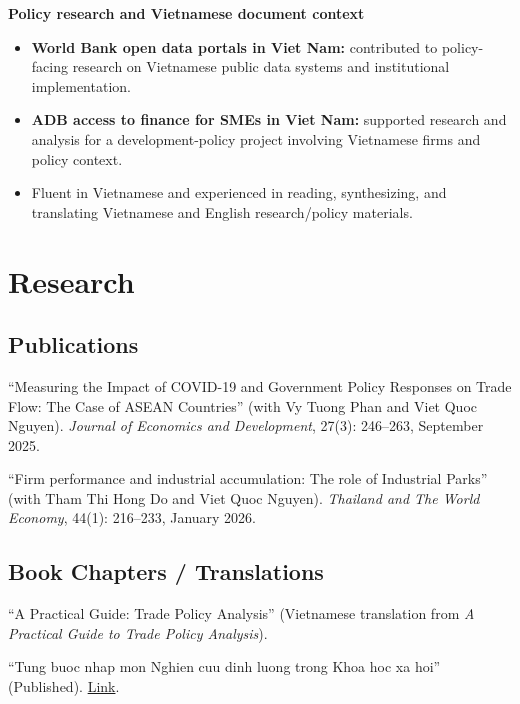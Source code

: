 \documentclass[10pt]{article}
\begin{document}
\textbf{Policy research and Vietnamese document context}
\begin{itemize}
\item \textbf{World Bank open data portals in Viet Nam:} contributed to policy-facing research on Vietnamese public data systems and institutional implementation.
\item \textbf{ADB access to finance for SMEs in Viet Nam:} supported research and analysis for a development-policy project involving Vietnamese firms and policy context.
\item Fluent in Vietnamese and experienced in reading, synthesizing, and translating Vietnamese and English research/policy materials.
\end{itemize}

\section{Research}
\subsection{Publications}
\begin{enumerate}[label={[\arabic*]}]
\item ``Measuring the Impact of COVID-19 and Government Policy Responses on Trade Flow: The Case of ASEAN Countries'' (with Vy Tuong Phan and Viet Quoc Nguyen). \textit{Journal of Economics and Development}, 27(3): 246--263, September 2025.
\item ``Firm performance and industrial accumulation: The role of Industrial Parks'' (with Tham Thi Hong Do and Viet Quoc Nguyen). \textit{Thailand and The World Economy}, 44(1): 216--233, January 2026.
\end{enumerate}

\subsection{Book Chapters / Translations}
\begin{enumerate}[label={[\arabic*]}]
\item ``A Practical Guide: Trade Policy Analysis'' (Vietnamese translation from \textit{A Practical Guide to Trade Policy Analysis}).
\item ``Tung buoc nhap mon Nghien cuu dinh luong trong Khoa hoc xa hoi'' (Published). \href{https://iper.org.vn/tung-buoc-nhap-mon-nghien-cuu-dinh-luong-trong-khoa-hoc-xa-hoi/?fbclid=IwY2xjawHgVrpleHRuA2FlbQIxMAABHa6F89lOrPrL6ttiGWy61X8z5VlsBT-hDcrzjIUt9oHilFVG-pKhTq2CUQ_aem_buxMo8Ym0baFn8OR_dPpAw}{Link}.
\end{enumerate}
\end{document}
